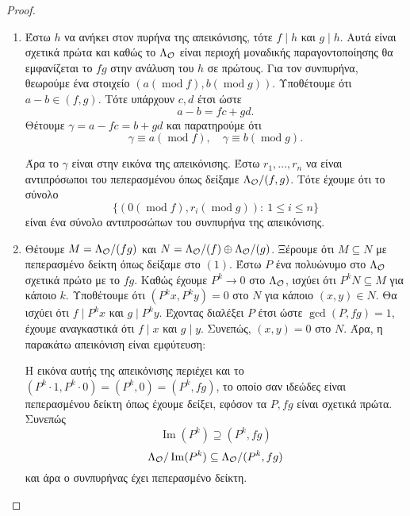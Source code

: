\begin{proof}

    \begin{enumerate}
        \item Έστω $h$ να ανήκει στον πυρήνα της απεικόνισης, τότε $f\mid h$ και $g\mid h$. Αυτά είναι σχετικά πρώτα και καθώς το $\Lambda_\mathcal{O}$ είναι περιοχή μοναδικής παραγοντοποίησης θα εμφανίζεται το $fg$ στην ανάλυση του $h$ σε πρώτους. Για τον συνπυρήνα, θεωρούμε ένα στοιχείο $(a(\operatorname{mod}f), b(\operatorname{mod}g))$. Υποθέτουμε ότι $a-b \in (f,g)$. Τότε υπάρχουν $c,d$ έτσι ώστε 
        $$a-b = fc + gd.$$
        Θέτουμε $\gamma = a-fc = b+gd$ και παρατηρούμε ότι 
        $$\gamma \equiv a(\operatorname{mod}f), \quad \gamma \equiv b (\operatorname{mod}g) .$$

        Άρα το $\gamma$ είναι στην εικόνα της απεικόνισης. Έστω $r_1,\ldots, r_n$ να είναι αντιπρόσωποι του πεπερασμένου όπως δείξαμε $\Lambda_\mathcal{O}/(f,g)$. Τότε έχουμε ότι το σύνολο
        $$\{(0 (\operatorname{mod}f), r_i (\operatorname{mod}g)): \ 1\leq i \leq n\}$$
        είναι ένα σύνολο αντιπροσώπων του συνπυρήνα της απεικόνισης.

        \item Θέτουμε $M = \Lambda_\mathcal{O}/(fg)$ και $N = \Lambda_\mathcal{O}/(f)\oplus \Lambda_\mathcal{O}/(g)$. Ξέρουμε ότι $M\subseteq N$ με πεπερασμένο δείκτη όπως δείξαμε στο $(1)$. Έστω $P$ ένα  πολυώνυμο στο $\Lambda_\mathcal{O}$ σχετικά πρώτο με το $fg$. Καθώς έχουμε $P^k \rightarrow 0$ στο $\Lambda_\mathcal{O}$, ισχύει ότι $P^k N \subseteq M$ για κάποιο $k$. Υποθέτουμε ότι $(P^k x, P^k y) = 0$ στο $N$ για κάποιο $(x,y)\in N$. Θα ισχύει ότι $f\mid P^kx$ και $g\mid P^ky$. Έχοντας διαλέξει $P$ έτσι ώστε $\gcd(P,fg)= 1$, έχουμε αναγκαστικά ότι $f\mid x$ και $g\mid y$. Συνεπώς, $(x,y) = 0 $ στο $N$. Άρα, η παρακάτω απεικόνιση είναι εμφύτευση:
        \begin{figure}[H]
            \centering
        \end{figure}

        Η εικόνα αυτής της απεικόνισης περιέχει και το $(P^k \cdot 1, P^k \cdot 0) = (P^k,0) = (P^k,fg)$, το οποίο σαν ιδεώδες είναι πεπερασμένου δείκτη όπως έχουμε δείξει, εφόσον τα $P,fg$ είναι σχετικά πρώτα. Συνεπώς
        $$\operatorname{Im}(P^k) \supseteq (P^k,fg) $$
        $$\Lambda_\mathcal{O}/\operatorname{Im}(P^k) \subseteq \Lambda_\mathcal{O}/(P^k,fg)$$ και άρα ο συνπυρήνας έχει πεπερασμένο δείκτη.
    \end{enumerate}
\end{proof}

